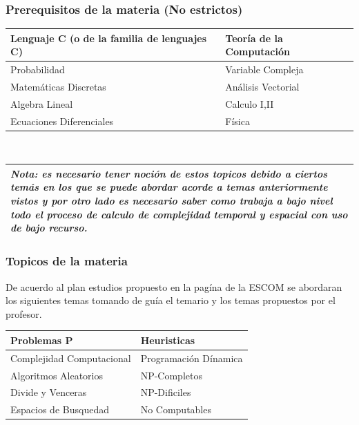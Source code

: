 \documentclass[10pt,executivepaper]{article}
\begin{document}
\subsubsection{Prerequisitos de la materia (No estrictos)}
\begin{center}
	\begin{tabular}{|p{5.5cm}|p{5.5cm}|}
		\hline
		Lenguaje C (o de la familia de lenguajes C) &	 Teoría de la Computación \\
		\hline
		Probabilidad &  Variable Compleja \\
		\hline
		Matemáticas Discretas &  Análisis Vectorial \\
		\hline
		Algebra Lineal &  Calculo I,II \\
		\hline
		Ecuaciones Diferenciales & Física \\
		\hline
	\end{tabular}
	\\\vspace{2.5mm}
	\begin{tabular}{|p{13cm}|}
		\hline
		\textit{Nota: es necesario tener noción de estos topicos debido
		a ciertos temás en los que se puede abordar acorde a temas anteriormente
		vistos y por otro lado es necesario saber como trabaja a bajo nivel todo
		el proceso de calculo de complejidad temporal y espacial con uso de bajo recurso.}\\
		\hline
	\end{tabular}
\end{center}
\subsubsection{Topicos de la materia}
De acuerdo al plan estudios propuesto en la pagína de la ESCOM se abordaran los siguientes temas tomando de guía el temario y los temas propuestos por el profesor.
\begin{center}
	\begin{tabular}{|p{5.5cm}|p{5.5cm}|}
		\hline
		Problemas P & Heuristicas\\
		\hline
		Complejidad Computacional & Programación Dínamica \\
		\hline
		Algoritmos Aleatorios & NP-Completos \\
		\hline
		Divide y Venceras & NP-Dificiles\\
		\hline
		Espacios de Busquedad & No Computables \\
		\hline
	\end{tabular}
\end{center}
\end{document}
